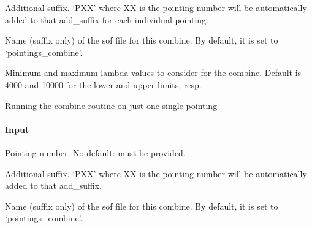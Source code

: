 \documentclass[letterpaper,10pt,english]{sphinxmanual}
\begin{document}
\begin{fulllineitems}
\begin{fulllineitems}
\begin{description}
\sphinxAtStartPar
Additional suffix. ‘PXX’ where XX is the pointing number
will be automatically added to that add\_suffix for
each individual pointing.

\sphinxAtStartPar
Name (suffix only) of the sof file for this combine.
By default, it is set to ‘pointings\_combine’.

\sphinxAtStartPar
Minimum and maximum lambda values to consider for the combine.
Default is 4000 and 10000 for the lower and upper limits, resp.

\end{description}

\end{fulllineitems}


\begin{fulllineitems}
\label{\detokenize{api/pymusepipe:pymusepipe.combine.MusePointings.run_combine_single_pointing}}
\pysigstartsignatures
{}
\pysigstopsignatures
\sphinxAtStartPar
Running the combine routine on just one single pointing


\paragraph{Input}
\label{\detokenize{api/pymusepipe:id51}}\begin{description}
\sphinxAtStartPar
Pointing number. No default: must be provided.

\sphinxAtStartPar
Additional suffix. ‘PXX’ where XX is the pointing number
will be automatically added to that add\_suffix.

\sphinxAtStartPar
Name (suffix only) of the sof file for this combine.
By default, it is set to ‘pointings\_combine’.


\end{description}
\end{fulllineitems}
\end{fulllineitems}
\end{document}
